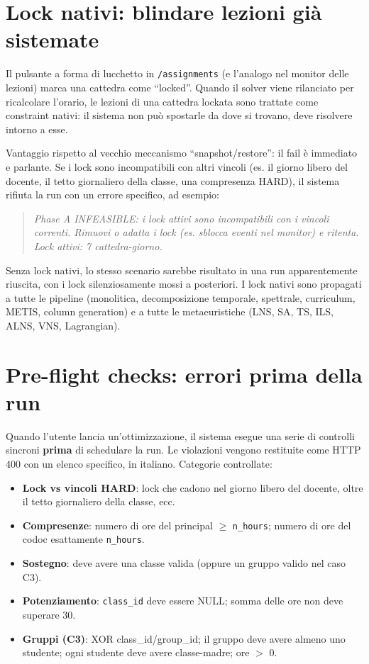 \section{Lock nativi: blindare lezioni gi\`a sistemate}

Il pulsante a forma di lucchetto in \texttt{/assignments}
(e l'analogo nel monitor delle lezioni) marca una cattedra
come ``locked''. Quando il solver viene rilanciato per
ricalcolare l'orario, le lezioni di una cattedra lockata
sono trattate come constraint nativi: il sistema non pu\`o
spostarle da dove si trovano, deve risolvere intorno a
esse.

Vantaggio rispetto al vecchio meccanismo
``snapshot/restore'': il fail \`e immediato e parlante. Se
i lock sono incompatibili con altri vincoli (es. il giorno
libero del docente, il tetto giornaliero della classe, una
compresenza HARD), il sistema rifiuta la run con un errore
specifico, ad esempio:
\begin{quote}
\textit{Phase A INFEASIBLE: i lock attivi sono incompatibili
con i vincoli correnti. Rimuovi o adatta i lock (es.
sblocca eventi nel monitor) e ritenta. Lock attivi: 7
cattedra-giorno.}
\end{quote}

Senza lock nativi, lo stesso scenario sarebbe risultato in
una run apparentemente riuscita, con i lock silenziosamente
mossi a posteriori. I lock nativi sono propagati a tutte le
pipeline (monolitica, decomposizione temporale, spettrale,
curriculum, METIS, column generation) e a tutte le
metaeuristiche (LNS, SA, TS, ILS, ALNS, VNS, Lagrangian).

\section{Pre-flight checks: errori prima della run}

Quando l'utente lancia un'ottimizzazione, il sistema esegue
una serie di controlli sincroni \textbf{prima} di
schedulare la run. Le violazioni vengono restituite come
HTTP 400 con un elenco specifico, in italiano. Categorie
controllate:
\begin{itemize}
\item \textbf{Lock vs vincoli HARD}: lock che cadono nel
giorno libero del docente, oltre il tetto giornaliero della
classe, ecc.
\item \textbf{Compresenze}: numero di ore del principal
$\geq$ \texttt{n\_hours}; numero di ore del codoc esattamente
\texttt{n\_hours}.
\item \textbf{Sostegno}: deve avere una classe valida
(oppure un gruppo valido nel caso C3).
\item \textbf{Potenziamento}: \texttt{class\_id} deve essere
NULL; somma delle ore non deve superare 30.
\item \textbf{Gruppi (C3)}: XOR class\_id/group\_id; il
gruppo deve avere almeno uno studente; ogni studente deve
avere classe-madre; ore $>$ 0.
\end{itemize}

